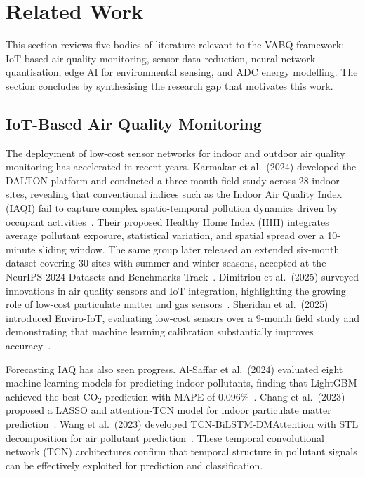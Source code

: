 \section{Related Work}
\label{sec:related_work}

This section reviews five bodies of literature relevant to the VABQ framework: IoT-based air quality monitoring, sensor data reduction, neural network quantisation, edge AI for environmental sensing, and ADC energy modelling. The section concludes by synthesising the research gap that motivates this work.

\subsection{IoT-Based Air Quality Monitoring}
\label{sec:rw_aqm}

The deployment of low-cost sensor networks for indoor and outdoor air quality monitoring has accelerated in recent years. Karmakar et al.~(2024) developed the DALTON platform and conducted a three-month field study across 28 indoor sites, revealing that conventional indices such as the Indoor Air Quality Index (IAQI) fail to capture complex spatio-temporal pollution dynamics driven by occupant activities~\cite{karmakar2024exploring}. Their proposed Healthy Home Index (HHI) integrates average pollutant exposure, statistical variation, and spatial spread over a 10-minute sliding window. The same group later released an extended six-month dataset covering 30 sites with summer and winter seasons, accepted at the NeurIPS 2024 Datasets and Benchmarks Track~\cite{karmakar2024indoor}. Dimitriou et al.~(2025) surveyed innovations in air quality sensors and IoT integration, highlighting the growing role of low-cost particulate matter and gas sensors~\cite{dimitriou2025innovations}. Sheridan et al.~(2025) introduced Enviro-IoT, evaluating low-cost sensors over a 9-month field study and demonstrating that machine learning calibration substantially improves accuracy~\cite{enviroiot2025}.

Forecasting IAQ has also seen progress. Al-Saffar et al.~(2024) evaluated eight machine learning models for predicting indoor pollutants, finding that LightGBM achieved the best CO$_2$ prediction with MAPE of 0.096\%~\cite{forecasting2024iaq}. Chang et al.~(2023) proposed a LASSO and attention-TCN model for indoor particulate matter prediction~\cite{lassotcn2023}. Wang et al.~(2023) developed TCN-BiLSTM-DMAttention with STL decomposition for air pollutant prediction~\cite{tcnbilstm2023}. These temporal convolutional network (TCN) architectures confirm that temporal structure in pollutant signals can be effectively exploited for prediction and classification.

